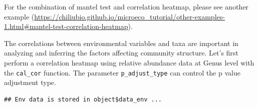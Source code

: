 \documentclass[
]{book}
\newenvironment{Shaded}{\begin{snugshade}}{\end{snugshade}}
\newcommand{\AttributeTok}[1]{\textcolor[rgb]{0.77,0.63,0.00}{#1}}
\newcommand{\CommentTok}[1]{\textcolor[rgb]{0.56,0.35,0.01}{\textit{#1}}}
\newcommand{\ConstantTok}[1]{\textcolor[rgb]{0.00,0.00,0.00}{#1}}
\newcommand{\DecValTok}[1]{\textcolor[rgb]{0.00,0.00,0.81}{#1}}
\newcommand{\FunctionTok}[1]{\textcolor[rgb]{0.00,0.00,0.00}{#1}}
\newcommand{\NormalTok}[1]{#1}
\newcommand{\OtherTok}[1]{\textcolor[rgb]{0.56,0.35,0.01}{#1}}
\newcommand{\SpecialCharTok}[1]{\textcolor[rgb]{0.00,0.00,0.00}{#1}}
\newcommand{\StringTok}[1]{\textcolor[rgb]{0.31,0.60,0.02}{#1}}
\begin{document}
\begin{Shaded}
\end{Shaded}

For the combination of mantel test and correlation heatmap,
please see another example (\url{https://chiliubio.github.io/microeco_tutorial/other-examples-1.html\#mantel-test-correlation-heatmap}).

The correlations between environmental variables and taxa are important in analyzing and inferring the factors affecting community structure.
Let's first perform a correlation heatmap using relative abundance data at Genus level with the \texttt{cal\_cor} function.
The parameter \texttt{p\_adjust\_type} can control the p value adjustment type.

\begin{Shaded}
\end{Shaded}

\begin{verbatim}
## Env data is stored in object$data_env ...
\end{verbatim}

\begin{Shaded}
\end{Shaded}
\end{document}
